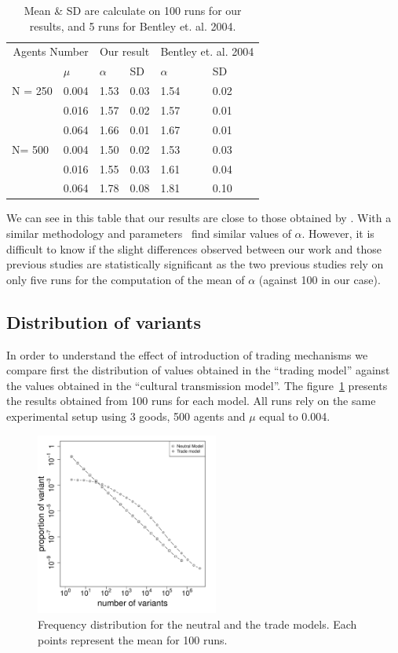 \documentclass{wscpaperproc}
\begin{document}
\begin{table}[h]
	\centering
	\begin{tabular}{ll|llll}
		\multicolumn{2}{r}{Agents Number}&\multicolumn{2}{c}{Our result}&\multicolumn{2}{c}{Bentley et. al. 2004}\\
			&$\mu$ & $\alpha$ & SD&$\alpha$&SD\\\hline
		N = 250	&0.004&1.53&0.03&1.54&0.02\\
			&0.016&1.57&0.02&1.57&0.01\\
			&0.064&1.66&0.01&1.67&0.01\\\hline
		N= 500	&0.004&1.50&0.02&1.53&0.03\\
			&0.016&1.55&0.03&1.61&0.04\\
			&0.064&1.78&0.08&1.81&0.10\\
	\end{tabular}
	\caption{Mean \& SD are calculate on 100 runs for our results, and 5 runs for Bentley et. al. 2004.}
	\label{tab:mualpha}
\end{table}

We can see in this table that our results are close to those obtained by \cite{bentley_random_2004}. With a similar methodology and parameters~\cite{mesoudi_random_2009} find similar values of $\alpha$. However, it is difficult to know if the slight differences observed between our work and those previous studies are statistically significant as the two previous studies rely on only five runs for the computation of the mean of $\alpha$ (against 100 in our case).

\subsection{Distribution of variants}

In order to understand the effect of introduction of trading mechanisms we compare first the distribution of values obtained in the ``trading model'' against the values obtained in the ``cultural transmission model''. The figure~\ref{fig:2setDi} presents the results obtained from 100 runs for each model. All runs rely on the same experimental setup using 3 goods, 500 agents and $\mu$ equal to 0.004. 

\begin{figure}[H]
	\begin{center}
		\includegraphics[width=6cm]{img/2SetupDistrib.pdf}
	\end{center}
	\caption{Frequency distribution for the neutral and the trade models. Each points represent the mean for 100 runs.}
	\label{fig:2setDi}
\end{figure}
\end{document}
